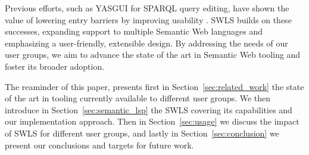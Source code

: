 
Previous efforts, such as YASGUI for SPARQL query editing, have shown the value of lowering entry barriers by improving usability \cite{10.3233/SW-150197,10.1007/978-3-642-41242-4_7}. 
SWLS builds on these successes, expanding support to multiple Semantic Web languages and emphasizing a user-friendly, extensible design. 
By addressing the needs of our user groups, we aim to advance the state of the art in Semantic Web tooling and foster its broader adoption.

The reaminder of this paper, presents first in Section~\ref{sec:related_work} the state of the art in tooling currently available to different user groups.
We then introduce in Section~\ref{sec:semantic_lsp} the SWLS covering its capabilities and our implementation approach.
Then in Section~\ref{sec:usage} we discuss the impact of SWLS for different user groups,
and lastly in Section~\ref{sec:conclusion} we present our conclusions and targets for future work.

